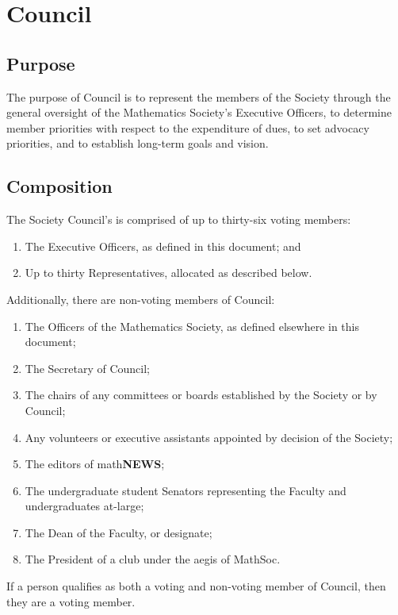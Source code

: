 \section{Council}

\subsection{Purpose}
The purpose of Council is to represent the members of the Society 
through the general oversight of the Mathematics Society’s Executive Officers,
to determine member priorities with respect to the expenditure of dues, 
to set advocacy priorities, and to establish long-term goals and vision.

\subsection{Composition}
The Society Council's is comprised of up to thirty-six voting members:
\begin{enumerate}
    \item The Executive Officers, as defined in this document; and
    \item Up to thirty Representatives, allocated as described below.
\end{enumerate}

\noindent Additionally, there are non-voting members of Council:
\begin{enumerate}
    \item The Officers of the Mathematics Society, as defined elsewhere in this
        document;
    \item The Secretary of Council;
    \item The chairs of any committees or boards established by the Society or by
        Council;
    \item Any volunteers or executive assistants appointed by decision of the
        Society;
    \item The editors of math\textbf{\textsf{NEWS}};
    \item The undergraduate student Senators representing the Faculty and
        undergraduates at-large;
    \item The Dean of the Faculty, or designate;
    \item The President of a club under the aegis of MathSoc.
\end{enumerate}

If a person qualifies as both a voting and non-voting member of Council, then
they are a voting member.

